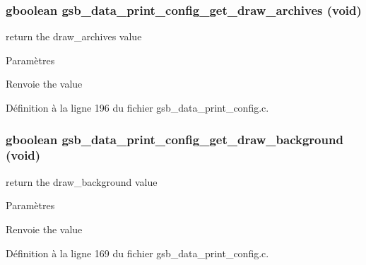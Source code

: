 \subsubsection[{gsb\_\-data\_\-print\_\-config\_\-get\_\-draw\_\-archives}]{\setlength{\rightskip}{0pt plus 5cm}gboolean gsb\_\-data\_\-print\_\-config\_\-get\_\-draw\_\-archives (void)}\label{gsb__data__print__config_8c_a6e773923f44e66e6e047ec8bd6bbdb21}
return the draw\_\-archives value


\begin{DoxyParams}{Paramètres}
\item[{\em }]\end{DoxyParams}
\begin{DoxyReturn}{Renvoie}
the value 
\end{DoxyReturn}


Définition à la ligne 196 du fichier gsb\_\-data\_\-print\_\-config.c.

\subsubsection[{gsb\_\-data\_\-print\_\-config\_\-get\_\-draw\_\-background}]{\setlength{\rightskip}{0pt plus 5cm}gboolean gsb\_\-data\_\-print\_\-config\_\-get\_\-draw\_\-background (void)}\label{gsb__data__print__config_8c_aba43ee990b36315212df9e30ce5a640e}
return the draw\_\-background value


\begin{DoxyParams}{Paramètres}
\item[{\em }]\end{DoxyParams}
\begin{DoxyReturn}{Renvoie}
the value 
\end{DoxyReturn}


Définition à la ligne 169 du fichier gsb\_\-data\_\-print\_\-config.c.

